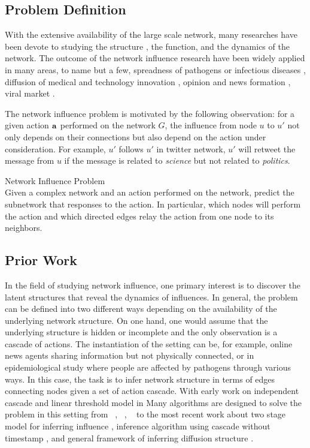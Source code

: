 {\subsection{Problem Definition}
With the extensive availability of the large scale network, many researches have been devote to studying the structure , the function, and the dynamics of the network.
The outcome of the network influence research have been widely applied in many areas, to name but a few, spreadness of pathogens or infectious diseases \citep{Hethcote00the,Anderson02infectious}, diffusion of medical and technology innovation \citep{Strang98diffusion,Rogers03the}, opinion and news formation \citep{Adar04implicit,Gruhl04information,Adar05tracking,Leskovec07cascading,Nowell08tracing,Leskovec09meme}, viral market \citep{Domingos01mining,Kempe03maximizing,Liben-Nowell03the}.




The network influence problem is motivated by the following observation: for a given action $\mathbf {a}$ performed on the network $G$, the influence from node $u$ to $u'$ not only depends on their connections but also depend on the action under consideration.
For example, $u'$ follows $u'$ in twitter network, $u'$ will retweet the message from $u$ if the message is related to \textit{science} but not related to \textit{politics}.

\begin{definition}{Network Influence Problem}\\
	Given a complex network and an action performed on the network, predict the subnetwork that responses to the action. In particular, which nodes will perform the action and which directed edges relay the action from one node to its neighbors.
\end{definition}

\subsection{Prior Work}

In the field of studying network influence, one primary interest is to discover the latent structures that reveal the dynamics of influences.
In general, the problem can be defined into two different ways depending on the availability of the underlying network structure.
On one hand, one would assume that the underlying structure is hidden or incomplete and the only observation is a cascade of actions.
The instantiation of the setting can be, for example, online news agents sharing information but not physically connected, or in epidemiological study where people are affected by pathogens through various ways.
In this case, the task is to infer network structure in terms of edges connecting nodes given a set of action cascade.
With early work on independent cascade and linear threshold model in 
Many algorithms are designed to solve the problem in this setting from \netinf\ \citep{GomezRodriguez10inferring}, \netrate\ \citep{Rodrigues11unconvering}, \ \citep{Du12learning} to the most recent work about two stage model for inferring influence \citep{Du14influence}, inference algorithm using cascade without timestamp \citep{Amin14learning}, and general framework of inferring diffusion structure \citep{Daneshmand14estimating}.

}
